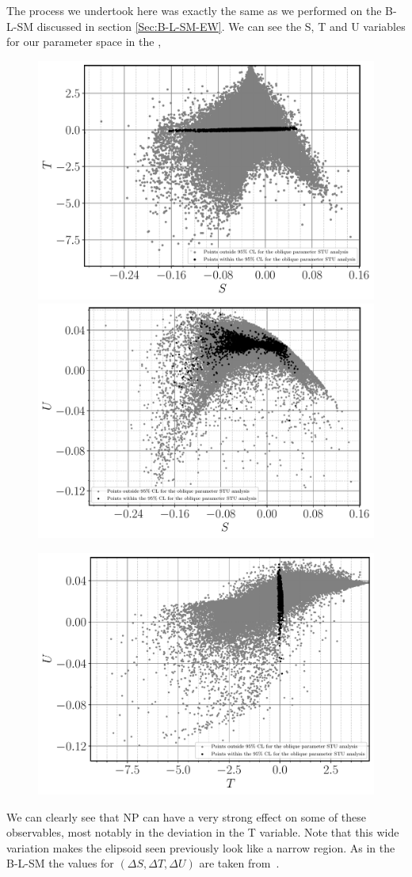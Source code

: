 The process we undertook here was exactly the same as we performed on the B-L-SM discussed in section \ref{Sec:B-L-SM-EW}. 
%
We can see the S, T and U variables for our parameter space in the  , 
%
\begin{figure}[H]
	\centering
	\includegraphics[width=.49\textwidth]{Images/3HDM/EW/EW_S_T_black.pdf}	\includegraphics[width=.49\textwidth]{Images/3HDM/EW/EW_S_U_black.pdf}
\end{figure}	
\begin{figure}[H]\ContinuedFloat
    \centering
	\includegraphics[width=.49\textwidth]{Images/3HDM/EW/EW_T_U_black.pdf}
	\caption{}
	\label{Fig:3HDM_STU}
\end{figure}
%
We can clearly see that NP can have a very strong effect on some of these observables, most notably in the deviation in the T variable.
%
Note that this wide variation makes the elipsoid seen previously look like a narrow region. 
%
As in the B-L-SM the values for $(\Delta S , \Delta T , \Delta U )$ are taken from  \,\cite{Baak_2012}.


